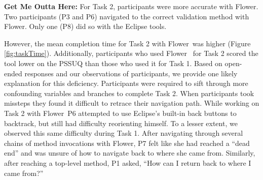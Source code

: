 \documentclass[conference]{IEEEtran}
\newcommand{\toolName}{Flower}
\begin{document}
\textbf{Get Me Outta Here:}
For Task 2, participants were more accurate with \toolName.
Two participants (P3 and P6) navigated to the correct validation method with \toolName.
Only one (P8) did so with the Eclipse tools.

However, the mean completion time for Task 2 with \toolName~was higher (Figure \ref{fig:taskTime}).
Additionally, participants who used \toolName~ for Task 2 scored the tool lower on the PSSUQ than those who used it for Task 1.
Based on open-ended responses and our observations of participants, we provide one likely explanation for this deficiency.
Participants were required to sift through more confounding variables and branches to complete Task 2.
When participants took missteps they found it difficult to retrace their navigation path.
While working on Task 2 with \toolName~P6 attempted to use Eclipse's built-in back buttons to backtrack, but still had difficulty reorienting himself. 
To a lesser extent, we observed this same difficulty during Task 1.
After navigating through several chains of method invocations with \toolName, P7 felt like she had reached a ``dead end'' and was unsure of how to navigate back to where she came from.
Similarly, after reaching a top-level method, P1 asked, ``How can I return back to where I came from?''





\end{document}
